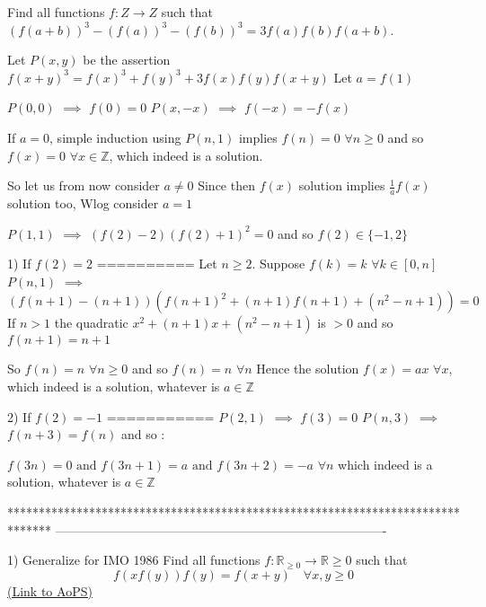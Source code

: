 \begin{solution}
	\begin{tcolorbox}Find all  functions $f:Z \rightarrow Z$  such that $(f(a+b))^3-(f(a))^3-(f(b))^3=3f(a)f(b)f(a+b)$.\end{tcolorbox}
Let $P(x,y)$ be the assertion $f(x+y)^3=f(x)^3+f(y)^3+3f(x)f(y)f(x+y)$
Let $a=f(1)$

$P(0,0)$ $\implies$ $f(0)=0$
$P(x,-x)$ $\implies$ $f(-x)=-f(x)$

If $a=0$, simple induction using $P(n,1)$ implies $f(n)=0$ $\forall n\ge 0$ and so $\boxed{f(x)=0}$ $\forall x\in\mathbb Z$, which indeed is a solution.

So let us from now consider $a\ne 0$
Since then $f(x)$ solution implies $\frac 1af(x)$ solution too, Wlog consider $a=1$

$P(1,1)$ $\implies$ $(f(2)-2)(f(2)+1)^2=0$ and so $f(2)\in\{-1,2\}$

1) If $f(2)=2$
==========
Let $n\ge 2$. Suppose $f(k)=k$ $\forall k\in[0,n]$
$P(n,1)$ $\implies$ $(f(n+1)-(n+1))(f(n+1)^2+(n+1)f(n+1)+(n^2-n+1))=0$
If $n>1$ the quadratic $x^2+(n+1)x+(n^2-n+1)$ is $>0$ and so $f(n+1)=n+1$

So $f(n)=n$ $\forall n\ge 0$ and so $f(n)=n$ $\forall n$
Hence the solution $\boxed{f(x)=ax}$ $\forall x$, which indeed is a solution, whatever is $a\in\mathbb Z$

2) If $f(2)=-1$
===========
$P(2,1)$ $\implies$ $f(3)=0$
$P(n,3)$ $\implies$ $f(n+3)=f(n)$ and so :

$\boxed{f(3n)=0\text{ and }f(3n+1)=a\text{ and }f(3n+2)=-a}$ $\forall n$ which indeed is a solution, whatever is $a\in\mathbb Z$
\end{solution}
*******************************************************************************
-------------------------------------------------------------------------------

\begin{problem}
	1) Generalize for IMO 1986
Find all functions $f:\mathbb{R}_{\geq 0}\to\mathbb{R}{\geq 0}$ such that 
\[f(xf(y))f(y)=f(x+y) \quad  \forall x,y\geq 0\]
	\flushright \href{https://artofproblemsolving.com/community/c6h562718}{(Link to AoPS)}
\end{problem}



